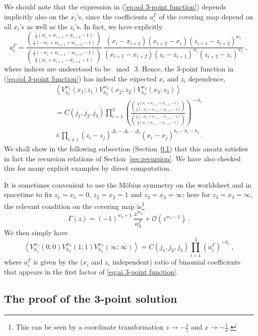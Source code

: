 \documentclass[12pt,a4paper]{article}
\newcommand{\be}{\begin{equation}}
\newcommand{\ee}{\end{equation}}
\begin{document}
We should note that the expression in (\ref{eq:sol 3-point function}) depends implicitly also on the $x_i$'s, since the coefficients $a_i^\Gamma$ of the covering map depend on all $x_i$'s as well as the $z_i$'s. In fact, we have explicitly \cite{Lunin:2000yv}
\be 
a_i^\Gamma=\frac{\binom{\frac{1}{2}(w_i+w_{i+1}+w_{i+2}-1)}{\frac{1}{2}(-w_i+w_{i+1}+w_{i+2}-1)}}{\binom{\frac{1}{2}(-w_i+w_{i+1}-w_{i+2}-1)}{\frac{1}{2}(w_i+w_{i+1}-w_{i+2}-1)}} \, \frac{(x_i-x_{i+1})(x_{i+2}-x_i)(z_{i+1}-z_{i+2})^{w_i}}{(x_{i+1}-x_{i+2})(z_i-z_{i+1})^{w_i}(z_{i+2}-z_i)^{w_{i}}} \ ,\label{eq:ai 3-point function}
\ee
where indices are understood to be $\bmod \ 3$. Hence, the $3$-point function in (\ref{eq:sol 3-point function}) has indeed the expected $x_i$ and $z_i$ dependence,
\begin{multline}
 \left \langle V_{h_1}^{w_1}(x_1;z_1)V_{h_2}^{w_2}(x_2;z_2)V_{h_3}^{w_3} (x_3;z_3)\right \rangle \\
 =C(j_1,j_2,j_3)\prod_{i=1}^3 \left(\frac{\binom{\frac{1}{2}(w_i+w_{i+1}+w_{i+2}-1)}{\frac{1}{2}(-w_i+w_{i+1}+w_{i+2}-1)}}{\binom{\frac{1}{2}(-w_i+w_{i+1}-w_{i+2}-1)}{\frac{1}{2}(w_i+w_{i+1}-w_{i+2}-1)}}\right)^{\!\!\!-h_i}\\
\times
\prod_{i\neq j} (z_i - z_j)^{\Delta_{\ell} - \Delta_i - \Delta_j}(x_i - x_j)^{h_{\ell} - h_i - h_j} \ .
\end{multline}
We shall show in the following subsection (Section~\ref{sec:3pointproof}) that this ansatz satisfies in fact the recursion relations of Section~\ref{sec:recursion}. We have also checked this for many explicit examples by direct computation.


It is sometimes convenient to use the M\"obius symmetry on the worldsheet and in spacetime to fix
 $z_1=x_1=0$, $z_2=x_2=1$ and $z_3=x_3=\infty$; here for $z_3=x_3=\infty$, the relevant condition on the covering map is\footnote{This can be seen by a coordinate transformation $z \to -\tfrac{1}{z}$ and $x \to -\tfrac{1}{x}$.}
\be 
\Gamma(z)=(-1)^{w_3+1} \, \frac{z^{w_3}}{a_3^\Gamma}+\mathcal{O}(z^{w_3-1})\ .
\ee
We then simply have
\be \label{eq:3point}
 \left \langle V_{h_1}^{w_1}(0;0)V_{h_2}^{w_2}(1;1)V_{h_3}^{w_3} (\infty;\infty)\right \rangle=C(j_1,j_2,j_3)\prod_{i=1}^3  (a_i^\Gamma)^{-h_i}\ ,
\ee
where $a_i^\Gamma$ is given by the ($x_i$ and $z_i$ independent) ratio of binomial coefficients that appears in the first factor of \eqref{eq:ai 3-point function}. 


\subsection{The proof of the 3-point solution}\label{sec:3pointproof}
\end{document}
